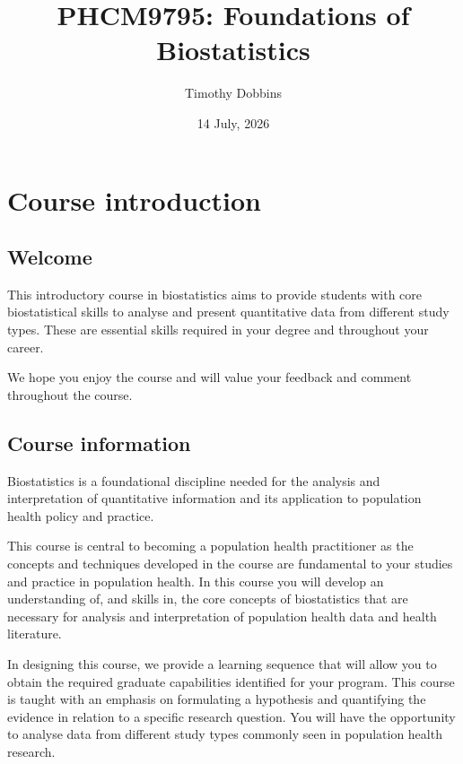 \documentclass[
  a4paper,
]{memoir}
\title{PHCM9795: Foundations of Biostatistics}
\author{Timothy Dobbins}
\date{14 July, 2026}
\begin{document}

\clearpage
\frontmatter
\tableofcontents*
\clearpage
\mainmatter

\mainmatter
{}

\chapter*{Course introduction}\label{course-introduction}


\section*{Welcome}\label{welcome}


This introductory course in biostatistics aims to provide students with
core biostatistical skills to analyse and present quantitative data from
different study types. These are essential skills required in your
degree and throughout your career.

We hope you enjoy the course and will value your feedback and comment
throughout the course.

\section*{Course information}\label{course-information}


Biostatistics is a foundational discipline needed for the analysis and
interpretation of quantitative information and its application to
population health policy and practice.

This course is central to becoming a population health practitioner as
the concepts and techniques developed in the course are fundamental to
your studies and practice in population health. In this course you will
develop an understanding of, and skills in, the core concepts of
biostatistics that are necessary for analysis and interpretation of
population health data and health literature.

In designing this course, we provide a learning sequence that will allow
you to obtain the required graduate capabilities identified for your
program. This course is taught with an emphasis on formulating a
hypothesis and quantifying the evidence in relation to a specific
research question. You will have the opportunity to analyse data from
different study types commonly seen in population health research.
\end{document}
